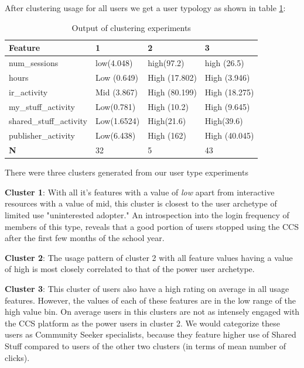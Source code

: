 \documentclass{acm_proc_article-sp}
\begin{document}
After clustering usage for all users we get a user typology as shown in table \ref{usertypology}:
\begin{table}
\label{usertypology}
\caption{Output of clustering experiments}
\begin{tabular}{|p{3cm}|p{1.5cm}|p{1.5cm}|p{1.5cm}|}
\hline Feature & 1 &  2 & 3 \\ 
\hline num\_sessions & low(4.048)& high(97.2)  & high (26.5)  \\ 
\hline hours & Low (0.649) & High (17.802) & High (3.946)  \\ 
\hline ir\_activity & Mid (3.867) & High (80.199) & High (18.275) \\ 
\hline my\_stuff\_activity &  Low(0.781)  & High (10.2) & High (9.645)  \\ 
\hline shared\_stuff\_activity & Low(1.6524) & High(21.6) & High(39.6) \\
\hline publisher\_activity & Low(6.438) & High (162) & High (40.045)  \\
\hline \textbf{N} & 32 & 5 & 43

\end{tabular}
\end{table} 

There were three clusters generated from our user type experiments

\textbf{Cluster 1}: With all it's features with a value of \textit{low} apart from interactive resources with a value of mid, this cluster is closest to the user archetype of limited use "uninterested adopter." An introspection into the login frequency of members of this type, reveals that a good portion of users stopped using the CCS after the first few months of the school year.

\textbf{Cluster 2}: The usage pattern of cluster 2 with all feature values having a value of high is most closely correlated to that of the power user archetype.

\textbf{Cluster 3}: This cluster of users also have a high rating on average in all usage features. However, the values of each of these features are in the low range of the high value bin. On average users in this clusters are not as intensely engaged with the CCS platform as the power users in cluster 2. We would categorize these users as Community Seeker specialists, because they feature higher use of Shared Stuff compared to users of the other two clusters (in terms of mean number of clicks).
\end{document}

